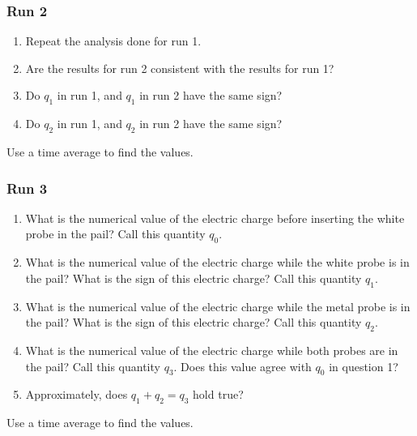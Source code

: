 \subsubsection{Run 2}
\begin{enumerate}
	\item Repeat the analysis done for run 1.
	\item Are the results for run 2 consistent with the results for run 1?
	\item Do $q_{1}$ in run 1, and $q_{1}$ in run 2 have the same sign?
	\item Do $q_{2}$ in run 1, and $q_{2}$ in run 2 have the same sign?
\end{enumerate}
Use a time average to find the values.
\subsubsection{Run 3}
\begin{enumerate}
	\item What is the numerical value of the electric charge before inserting the white probe in the pail? Call this quantity $q_{0}$.
	\item What is the numerical value of the electric charge while the white probe is in the pail? What is the sign of this electric charge? Call this quantity $q_{1}$.
	\item What is the numerical value of the electric charge while the metal probe is in the pail? What is the sign of this electric charge? Call this quantity $q_{2}$.
	\item What is the numerical value of the electric charge while both probes are in the pail? Call this quantity $q_{3}$. Does this value agree with $q_{0}$ in question 1?
	\item Approximately, does $q_{1} + q_{2} = q_{3}$ hold true?
\end{enumerate}
Use a time average to find the values.
